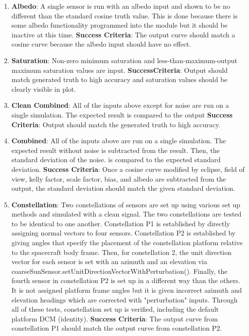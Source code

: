 \begin{enumerate}
	\item\textbf{Albedo}: A single sensor is run with an albedo input and shown to be no different than the standard cosine truth value. This is done because there is some albedo functionality programmed into the module but it should be inactive at this time.
	\subitem \textbf{Success Criteria}: The output curve should match a cosine curve because the albedo input should have no effect.
	\item \textbf{Saturation}: Non-zero minimum saturation and less-than-maximum-output maximum saturation values are input.
	\subitem\textbf{SuccessCriteria}: Output should match generated truth to high accuracy and saturation values should be clearly visible in plot.
	\item\textbf{Clean Combined}: All of the inputs above except for noise are run on a single simulation. The expected result is compared to the output
	\subitem \textbf{Success Criteria}: Output should match the generated truth to high accuracy.
	\item\textbf{Combined}: All of the inputs above are run on a single simulation. The expected result without noise is subtracted from the result. Then, the standard deviation of the noise. is compared to the expected standard deviation.
	\subitem \textbf{Success Criteria}: Once a cosine curve modified by eclipse, field of view, kelly factor, scale factor, bias, and albedo are subtracted from the output, the standard deviation should match the given standard deviation.
	\item\textbf{Constellation}: Two constellations of sensors are set up using various set up methods and simulated with a clean signal. The two constellations are tested to be identical to one another. Constellation P1 is established by directly assigning normal vectors to four sensors. Constellation P2 is established by giving angles that specify the placement of the constellation platform relative to the spacecraft body frame. Then, for constellation 2, the unit direction vector for each sensor is set with an azimuth and an elevation via coarseSunSensor.setUnitDirectionVectorWithPerturbation(). Finally, the fourth sensor in constellation P2 is set up in a different way than the others. It is not assigned platform frame angles but it is given incorrect azimuth and elevation headings which are corrected with "perturbation" inputs. Through all of these tests, constellation set up is verified, including the default platform DCM (identity).
	\subitem \textbf{Success Criteria}: The output curve from constellation P1 should match the output curve from constellation P2.
\end{enumerate}


